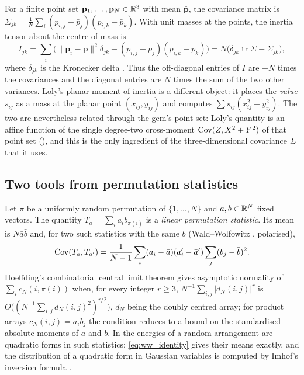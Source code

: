 For a finite point set $\mathbf p_1,\dots,\mathbf p_N\in\mathbb{R}^3$ with mean $\bar{\mathbf p}$, the covariance matrix is $\Sigma_{jk}=\frac1N\sum_i(p_{i,j}-\bar p_j)(p_{i,k}-\bar p_k)$.
With unit masses at the points, the inertia tensor about the centre of mass is
\begin{equation}
I_{jk}=\sum_i\bigl(\|\mathbf p_i-\bar{\mathbf p}\|^2\delta_{jk}-(p_{i,j}-\bar p_j)(p_{i,k}-\bar p_k)\bigr)
=N\bigl(\delta_{jk}\operatorname{tr}\Sigma-\Sigma_{jk}\bigr),
\label{eq:inertia_cov}
\end{equation}
where $\delta_{jk}$ is the Kronecker delta \cite{goldstein2002classical}.
Thus the off-diagonal entries of $I$ are $-N$ times the covariances and the diagonal entries are $N$ times the sum of the two other variances.
Loly's planar moment of inertia \cite{loly2004invariance} is a different object: it places the \emph{value} $s_{ij}$ as a mass at the planar point $(x_{ij},y_{ij})$ and computes $\sum s_{ij}(x_{ij}^2+y_{ij}^2)$.
The two are nevertheless related through the gem's point set: Loly's quantity is an affine function of the single degree-two cross-moment $\mathrm{Cov}(Z,X^2+Y^2)$ of that point set (), and this is the only ingredient of the three-dimensional covariance $\Sigma$ that it uses.

\subsection{Two tools from permutation statistics}
\label{sec:bg_perm}

Let $\pi$ be a uniformly random permutation of $\{1,\dots,N\}$ and $a,b\in\mathbb{R}^N$ fixed vectors.
The quantity $T_a=\sum_i a_i b_{\pi(i)}$ is a \emph{linear permutation statistic}.
Its mean is $N\bar a\bar b$ and, for two such statistics with the same $b$ (Wald--Wolfowitz \cite{waldwolfowitz1944}, polarised),
\begin{equation}
\mathrm{Cov}(T_a,T_{a'})=\frac{1}{N-1}\sum_i(a_i-\bar a)(a'_i-\bar a')\sum_j(b_j-\bar b)^2 .
\label{eq:ww_identity}
\end{equation}
Hoeffding's combinatorial central limit theorem \cite[Thm.~3]{hoeffding1951} gives asymptotic normality of $\sum_i c_N(i,\pi(i))$ when, for every integer $r\ge3$, $N^{-1}\sum_{i,j}|d_N(i,j)|^r$ is $O\bigl((N^{-1}\sum_{i,j}d_N(i,j)^2)^{r/2}\bigr)$, $d_N$ being the doubly centred array; for product arrays $c_N(i,j)=a_ib_j$ the condition reduces to a bound on the standardised absolute moments of $a$ and $b$.
In  the energies of a random arrangement are quadratic forms in such statistics; \eqref{eq:ww_identity} gives their means exactly, and the distribution of a quadratic form in Gaussian variables is computed by Imhof's inversion formula \cite{imhof1961}.

